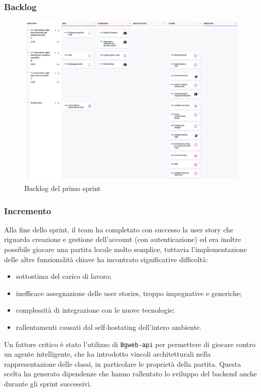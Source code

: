 \documentclass{article}
\begin{document}
\subsubsection{Backlog}
\begin{figure}[H]
    \centering
    \includegraphics[width=1\textwidth]{backlog1}
    \caption{Backlog del primo sprint}
    \label{fig:backlog-s1}
\end{figure}

\subsubsection{Incremento}
Alla fine dello sprint, il team ha completato con successo la user story che riguarda creazione e gestione dell'account 
(con autenticazione) ed era inoltre possibile giocare una partita locale molto semplice, tuttavia l'implementazione delle 
altre funzionalità chiave ha incontrato significative difficoltà:
\begin{itemize}
    \item sottostima del carico di lavoro;
    \item inefficace assegnazione delle user stories, troppo impegnative e generiche;
    \item complessità di integrazione con le nuove tecnologie;
    \item rallentamenti causati dal self-hostating dell'intero ambiente.
\end{itemize}

Un fattore critico è stato l'utilizzo di \texttt{Bgweb-api} per permettere di giocare contro un agente intelligente, che ha introdotto 
vincoli architetturali nella rappresentazione delle classi, in particolare le proprietà della partita. 
Questa scelta ha generato dipendenze che hanno rallentato lo sviluppo del backend anche durante gli sprint successivi.
\end{document}
